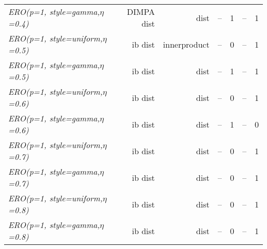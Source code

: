\documentclass[nohyperref]{article}
\theoremstyle{plain}
\theoremstyle{definition}
\theoremstyle{remark}
\begin{document}
\begin{table*}[!ht]
{\begin{tabular}{lrrrrrr}
			{\it ERO(p=1, style=gamma,$\eta$=0.4)} & DIMPA dist & dist & -- & 1 & -- & 1 \\
			{\it ERO(p=1, style=uniform,$\eta$=0.5)} & ib dist & innerproduct & -- & 0 & -- & 1 \\
			{\it ERO(p=1, style=gamma,$\eta$=0.5)} & ib dist & dist & -- & 1 & -- & 1 \\
			{\it ERO(p=1, style=uniform,$\eta$=0.6)} & ib dist & dist & -- & 0 & -- & 1 \\
			{\it ERO(p=1, style=gamma,$\eta$=0.6)} & ib dist & dist & -- & 1 & -- & 0 \\
			{\it ERO(p=1, style=uniform,$\eta$=0.7)} & ib dist & dist & -- & 0 & -- & 1 \\
			{\it ERO(p=1, style=gamma,$\eta$=0.7)} & ib dist & dist & -- & 0 & -- & 1 \\
			{\it ERO(p=1, style=uniform,$\eta$=0.8)} & ib dist & dist & -- & 0 & -- & 1 \\
			{\it ERO(p=1, style=gamma,$\eta$=0.8)} & ib dist & dist & -- & 0 & -- & 1 \\
\bottomrule
\end{tabular}}
\end{table*}
\end{document}
